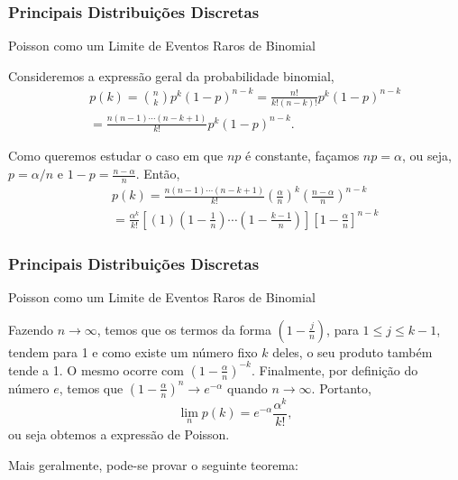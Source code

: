 \begin{frame}
\frametitle{\textbf{Principais Distribuições Discretas}}
\baselineskip=13pt
\begin{block}{Poisson como um Limite de Eventos Raros de Binomial}


Consideremos a expressão geral da probabilidade binomial,
\begin{eqnarray}
& & p(k)=\binom{n}{k}p^k(1-p)^{n-k}=\frac{n!}{k!(n-k)!}p^k(1-p)^{n-k}\nonumber \\
& & =\frac{n(n-1)\cdots(n-k+1)}{k!}p^k(1-p)^{n-k}.\nonumber
\end{eqnarray}

Como queremos estudar o caso em que $np$ é constante, façamos
$np=\alpha$, ou seja, $p=\alpha/n$ e $1-p=\frac{n-\alpha}{n}$.
Então,
%
\begin{eqnarray}
& &
p(k)=\frac{n(n-1)\cdots(n-k+1)}{k!}(\frac{\alpha}{n})^k(\frac{n-\alpha}{n})^{n-k}
\nonumber \\
& &
=\frac{\alpha^k}{k!}[(1)(1-\frac{1}{n})\cdots(1-\frac{k-1}{n})][1-\frac{\alpha}{n}]^{n-k}\nonumber
\end{eqnarray}

\end{block}
\end{frame}
%
\begin{frame}
\frametitle{\textbf{Principais Distribuições Discretas}}
\baselineskip=13pt
\begin{block}{Poisson como um Limite de Eventos Raros de Binomial}


Fazendo $n\rightarrow\infty$, temos que os termos da forma
$(1-\frac{j}{n})$, para $1\leq j\leq k-1$, tendem para 1 e como
existe um número fixo $k$ deles, o seu produto também tende a 1. O
mesmo ocorre com $(1-\frac{\alpha}{n})^{-k}$. Finalmente, por
definição do número $e$, temos que
$(1-\frac{\alpha}{n})^n\rightarrow e^{-\alpha}$ quando
$n\rightarrow\infty$. Portanto,
$$\lim_n p(k)=e^{-\alpha}\frac{\alpha^k}{k!},$$
ou seja obtemos a expressão de Poisson.

\end{block}

\begin{block}{}
Mais geralmente, pode-se provar o seguinte teorema:
\end{block}


\end{frame}

